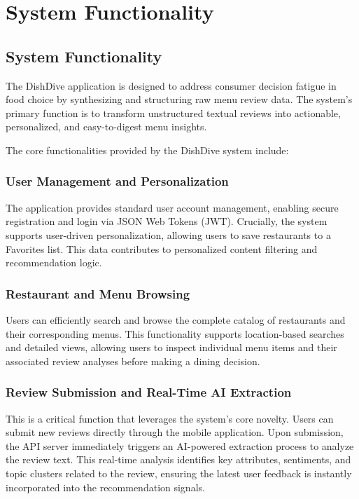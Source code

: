 \chapter{System Functionality}

\section{System Functionality}

The DishDive application is designed to address consumer decision fatigue in food choice by synthesizing and structuring raw menu review data. The system’s primary function is to transform unstructured textual reviews into actionable, personalized, and easy-to-digest menu insights.

The core functionalities provided by the DishDive system include:

\subsection{User Management and Personalization}

The application provides standard user account management, enabling secure registration and login via JSON Web Tokens (JWT). Crucially, the system supports user-driven personalization, allowing users to save restaurants to a Favorites list. This data contributes to personalized content filtering and recommendation logic.

\subsection{Restaurant and Menu Browsing}

Users can efficiently search and browse the complete catalog of restaurants and their corresponding menus. This functionality supports location-based searches and detailed views, allowing users to inspect individual menu items and their associated review analyses before making a dining decision.

\subsection{Review Submission and Real-Time AI Extraction}

This is a critical function that leverages the system’s core novelty. Users can submit new reviews directly through the mobile application. Upon submission, the API server immediately triggers an AI-powered extraction process to analyze the review text. This real-time analysis identifies key attributes, sentiments, and topic clusters related to the review, ensuring the latest user feedback is instantly incorporated into the recommendation signals.

